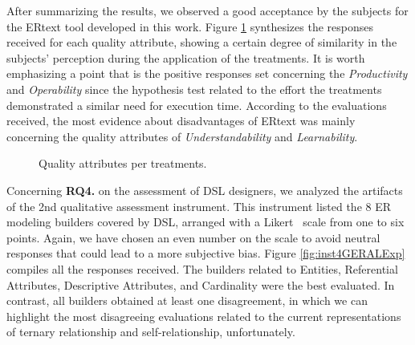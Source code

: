 After summarizing the results, we observed a good acceptance by the subjects for the ERtext tool developed in this work.
Figure \ref{fig:inst3GERALExp} synthesizes the responses received for each quality attribute, showing a certain degree of similarity in the subjects' perception during the application of the treatments.
It is worth emphasizing a point that is the positive responses set concerning the \textit{Productivity} and \textit{Operability} since the hypothesis test related to the effort the treatments demonstrated a similar need for execution time.
According to the evaluations received, the most evidence about disadvantages of ERtext was mainly concerning the quality attributes of \textit{Understandability} and \textit{Learnability}.

\begin{figure}[!htb]
    \centering
    \caption{Quality attributes per treatments.}
    \label{fig:inst3GERALExp}
    
\end{figure}

Concerning \textbf{RQ4.} on the assessment of DSL designers, we analyzed the artifacts of the 2nd qualitative assessment instrument.
This instrument listed the 8 ER modeling builders covered by DSL, arranged with a Likert~\cite{Likert} scale from one to six points.
Again, we have chosen an even number on the scale to avoid neutral responses that could lead to a more subjective bias.
Figure \ref{fig:inst4GERALExp} compiles all the responses received. 
The builders related to Entities, Referential Attributes, Descriptive Attributes, and Cardinality were the best evaluated.
In contrast, all builders obtained at least one disagreement, in which we can highlight the most disagreeing evaluations related to the current representations of ternary relationship and self-relationship, unfortunately.


